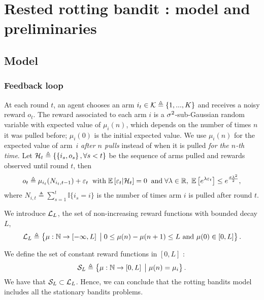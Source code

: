 \section{Rested rotting bandit : model and preliminaries}
\label{sec:Model}
\subsection{Model}
\subsubsection*{Feedback loop}
At each round $t$, an agent chooses an arm $i_t \in \mathcal{K} \triangleq \left\{ 1, ... , K\right\} $ and receives a noisy reward $o_t$. The reward associated to each arm $i$ is a $\sigma^2$-sub-Gaussian random variable with expected value of $\mu_i(n)$, which depends on the number of times $n$ it was pulled before; $\mu_i(0)$ is the initial expected value.
We use $\mu_i(n)$ for the expected value of arm~$i$ \textit{after $n$ pulls} instead of when it is pulled \textit{for the $n$-th time}. 
Let $\mathcal{H}_t \triangleq \left\{ \left\{ i_s, o_s \right\}, \forall s < t \right\}$ be the sequence of arms pulled and rewards observed until round $t$, then 
%
\begin{equation}
\label{eq:rested-feedback}
o_{t} \triangleq \mu_{i_t}(N_{i_t,t-1}) + \varepsilon_t
 \;\; \text{with}\; \mathbb{E}\left[ \varepsilon_t | \mathcal{H}_t \right]= 0 \;\; \text{and} \; \forall \lambda \in \mathbb{R}, \; \mathbb{E}\left[ e^{\lambda\varepsilon_t}\right] \leq e^{\frac{\sigma\lambda^2}{2}},
\end{equation}
%
where $N_{i,t}\triangleq \sum_{s\!=\!1}^{t} \mathbb{I}\{i_s \!=\! i\}$ is the number of times arm $i$ is pulled after round $t$.
\begin{definition}\label{def:rew-bounded-decay} 
We introduce $\mathcal{L}_L$, the set of non-increasing reward functions with bounded decay $L$,
\[ 
\mathcal{L}_L \triangleq \left\{ \mu : {\mathbb N} \rightarrow \left[- \infty,  L\right] \;\big{|}\; 0 \leq \mu(n) - \mu(n+1)  \leq L \text{ and } \mu(0) \in \left[0,  L\right] \right\}.
\]
\end{definition}
%
\begin{remark}
\label{rem:stationary-is-rotting}
We define the set of constant reward functions in $\left[0, L\right]$ : 
\[ 
\mathcal{S}_L \triangleq \left\{ \mu : {\mathbb N} \rightarrow \left[0,  L\right] \;\big{|}\;  \mu(n) = \mu_i  \right\}.
\]
We have that $\mathcal{S}_L \subset \mathcal{L}_L$. Hence, we can conclude that the rotting bandits model includes all the stationary bandits problems.
\end{remark}
%
